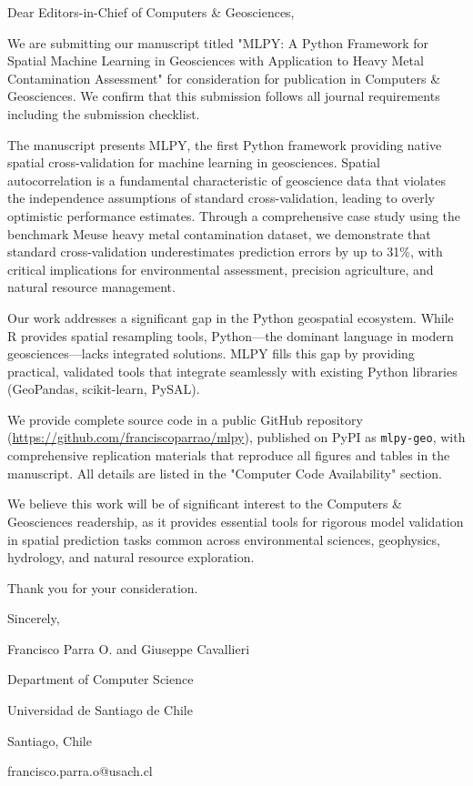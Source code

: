 \documentclass[a4paper,fleqn]{cas-sc}
\begin{document}
\begin{coverletter}

Dear Editors-in-Chief of Computers \& Geosciences,

We are submitting our manuscript titled "MLPY: A Python Framework for Spatial Machine Learning in Geosciences with Application to Heavy Metal Contamination Assessment" for consideration for publication in Computers \& Geosciences. We confirm that this submission follows all journal requirements including the submission checklist.

The manuscript presents MLPY, the first Python framework providing native spatial cross-validation for machine learning in geosciences. Spatial autocorrelation is a fundamental characteristic of geoscience data that violates the independence assumptions of standard cross-validation, leading to overly optimistic performance estimates. Through a comprehensive case study using the benchmark Meuse heavy metal contamination dataset, we demonstrate that standard cross-validation underestimates prediction errors by up to 31\%, with critical implications for environmental assessment, precision agriculture, and natural resource management.

Our work addresses a significant gap in the Python geospatial ecosystem. While R provides spatial resampling tools, Python---the dominant language in modern geosciences---lacks integrated solutions. MLPY fills this gap by providing practical, validated tools that integrate seamlessly with existing Python libraries (GeoPandas, scikit-learn, PySAL).

We provide complete source code in a public GitHub repository (\url{https://github.com/franciscoparrao/mlpy}), published on PyPI as \texttt{mlpy-geo}, with comprehensive replication materials that reproduce all figures and tables in the manuscript. All details are listed in the "Computer Code Availability" section.

We believe this work will be of significant interest to the Computers \& Geosciences readership, as it provides essential tools for rigorous model validation in spatial prediction tasks common across environmental sciences, geophysics, hydrology, and natural resource exploration.

Thank you for your consideration.

Sincerely,

Francisco Parra O. and Giuseppe Cavallieri

Department of Computer Science

Universidad de Santiago de Chile

Santiago, Chile

francisco.parra.o@usach.cl

\end{coverletter}
\end{document}
